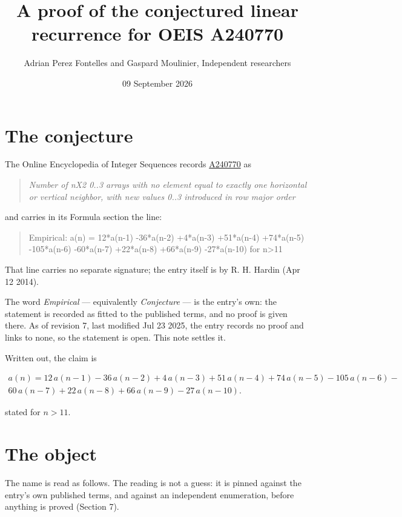 \documentclass[11pt]{article}
\title{A proof of the conjectured linear recurrence for OEIS A240770}
\author{Adrian Perez Fontelles and Gaspard Moulinier, Independent researchers}
\date{09 September 2026}
\theoremstyle{definition}
\begin{document}
\maketitle
\section{The conjecture}

The Online Encyclopedia of Integer Sequences records \href{https://oeis.org/A240770}{A240770} as

\begin{quote}\itshape Number of nX2 0..3 arrays with no element equal to exactly one horizontal or vertical neighbor, with new values 0..3 introduced in row major order\end{quote}

and carries in its Formula section the line:

\begin{quote}\ttfamily Empirical: a(n) = 12*a(n-1) -36*a(n-2) +4*a(n-3) +51*a(n-4) +74*a(n-5) -105*a(n-6) -60*a(n-7) +22*a(n-8) +66*a(n-9) -27*a(n-10) for n>11\end{quote}

That line carries no separate signature; the entry itself is by R. H. Hardin (Apr 12 2014).

The word {\itshape Empirical} --- equivalently {\itshape Conjecture} --- is the entry's own: the statement is recorded as fitted to the published terms, and no proof is given there. As of revision 7, last modified Jul 23 2025, the entry records no proof and links to none, so the statement is open. This note settles it.

Written out, the claim is

\begin{multline*} a(n) = 12\,a(n-1) - 36\,a(n-2) + 4\,a(n-3) + 51\,a(n-4) + 74\,a(n-5) - 105\,a(n-6) - \\ 60\,a(n-7) + 22\,a(n-8) + 66\,a(n-9) - 27\,a(n-10). \end{multline*}

stated for $n > 11$.

\section{The object}

The name is read as follows. The reading is not a guess: it is pinned against the entry's own published terms, and against an independent enumeration, before anything is proved (Section 7).
\end{document}
